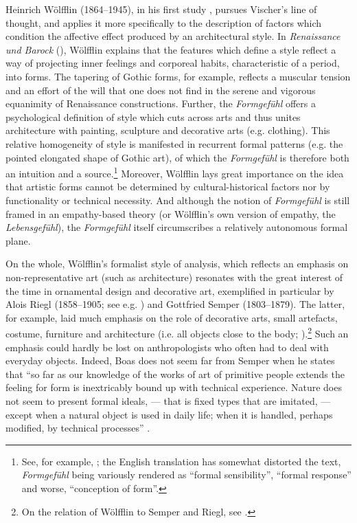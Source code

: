 \documentclass[output=paper]{langscibook}
\begin{document}
Heinrich Wölfflin (1864--1945), in his first study \citet{Wolfflin1886}, pursues Vischer's line of thought, and applies it more specifically to the description of factors which condition the affective effect produced by an architectural style. In \emph{Renaissance und Barock} (\citeyear{Wolfflin1888}), Wölfflin explains that the features which define a style reflect a way of projecting inner feelings and corporeal habits, characteristic of a period, into forms. The tapering of Gothic forms, for example, reflects a muscular tension and an effort of the will that one does not find in the serene and vigorous equanimity of Renaissance  constructions. Further, the \emph{Formgefühl} offers a psychological definition of style which cuts across arts and thus unites architecture with painting, sculpture and decorative arts (e.g. clothing). This relative homogeneity of style is manifested in recurrent formal patterns (e.g. the pointed elongated shape of Gothic art), of which the \emph{Formgefühl} is therefore both an intuition and a source.\footnote{See, for example, \citet[ch. 3]{Wolfflin1888}; the English translation has somewhat distorted the text, \emph{Formgefühl} being variously rendered as ``formal sensibility'', ``formal response'' and worse, ``conception of form''.} Moreover, Wölfflin lays great importance on the idea that artistic forms cannot be determined by cultural-historical factors nor by functionality or technical necessity. And although the notion of \emph{Formgefühl} is still framed in an empathy-based theory (or Wölfflin's own version of empathy, the \emph{Lebensgefühl}), the \emph{Formgefühl} itself circumscribes a relatively autonomous formal plane.

On the whole, Wölfflin's formalist style of analysis, which reflects an emphasis on non-representative art (such as architecture) resonates with the great interest of the time in ornamental design and decorative art, exemplified in particular by Alois Riegl (1858--1905; see e.g. \citealt{Riegl1893}) and Gottfried Semper (1803--1879). The latter, for example, laid much emphasis on the role of decorative arts, small artefacts, costume, furniture and architecture (i.e. all objects close to the body; \citealt{Semper1884}).\footnote{On the relation of Wölfflin to Semper and Riegl, see \citet{Payne2012}.} Such an emphasis could hardly be lost on anthropologists who often had to deal with everyday objects. Indeed, Boas does not seem far from Semper when he states that ``so far as our knowledge of the works of art of primitive people extends the feeling for form is inextricably bound up with technical experience. Nature does not seem to present formal ideals, — that is fixed types that are imitated, — except when a natural object is used in daily life; when it is handled, perhaps modified, by technical processes'' \citep[11]{Boas1927}.
\end{document}
